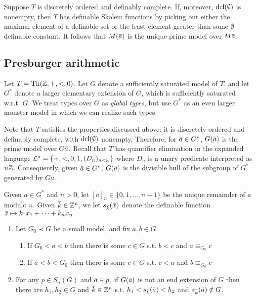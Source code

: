 \documentclass[11pt]{article}
\begin{document}
Suppose \(T\) is discretely ordered and definably complete. If, moreover, \(\operatorname{dcl}(\emptyset)\) is
nonempty, then \(T\) has definable Skolem functions by picking out either the maximal element of
a definable set or the least element greater than some \(\emptyset\)-definable constant. It follows
that \(M(\bara)\) is the unique prime model over \(M\bara\). \label{Problem3}
\subsection{Presburger arithmetic}
\label{sec:org00b21b4}
Let \(T=\operatorname{Th}(\mathbb{Z},+,<,0)\). Let \(G\) denote a sufficiently saturated model of \(T\), and
let \(G^*\) denote a larger elementary extension of \(G\), which is sufficiently saturated
w.r.t. \(G\). We treat types over \(G\) as \emph{global types}, but use \(G^*\) as an even larger
monster model in which we can realize such types.

Note that \(T\) satisfies the properties discussed above: it is discretely ordered and definably
complete, with \(\operatorname{dcl}(\emptyset)\) nonempty. Therefore, for \(\bara\in G^*\), \(G(\bara)\) is the prime
model over \(G\bara\). Recall that \(T\) has quantifier elimination in the expanded language
\(\mathcal{L}^*=\{+,<,0,1,(D_n)_{n<\omega}\}\) where \(D_n\) is a unary predicate interpreted as \(n\mathbb{Z}\).
Consequently, given \(\bara\in G^*\), \(G(\bara)\) is the divisible hull of the subgroup
of \(G^*\) generated by \(G\bara\).  \label{Problem4}

Given \(a\in G^*\) and \(n>0\), let \([a]_n\in\{0,1,\dots,n-1\}\) be the unique remainder of \(a\)
modulo \(n\). Given \(\bark\in\Z^n\), we let \(s_{\bark}(\barx)\) denote the definable function
\(\barx\mapsto k_1x_1+\dots+k_nx_n\)

\begin{proposition}[]
\label{0.4}
\begin{enumerate}
\item Let \(G_0\prec G\) be a small model, and fix \(a,b\in G\)
\begin{enumerate}
\item If \(G_0<a<b\) then there is some \(c\in G\) s.t. \(b<c\) and \(a\equiv_{G_0}c\)
\item If \(a<b<G_0\) then there is some \(c\in G\) s.t. \(c<a\) and \(b\equiv_{G_0}c\)
\end{enumerate}
\item For any \(p\in S_n(G)\) and \(\bara\vDash p\), if \(G(\bara)\) is not an end extension of \(G\) then
there are \(h_1,h_2\in G\) and \(\bark\in\Z^n\) s.t. \(h_1<s_{\bark}(\bara)<h_2\)
and \(s_{\bark}(\bara)\notin G\).
\end{enumerate}
\end{proposition}
\end{document}
